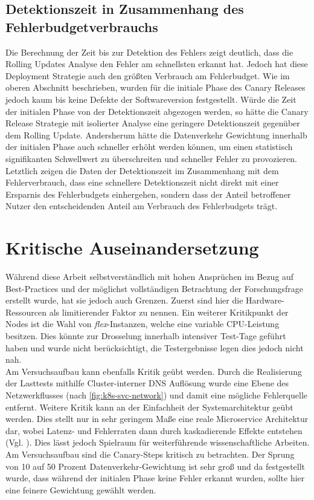 \documentclass[
12pt,
a4paper,
twoside,
openright
]{report}
\begin{document}
	\section{Detektionszeit in Zusammenhang des Fehlerbudgetverbrauchs}
	Die Berechnung der Zeit bis zur Detektion des Fehlers zeigt deutlich, dass die Rolling Updates Analyse den Fehler am schnellsten erkannt hat. Jedoch hat diese Deployment Strategie auch den größten Verbrauch am Fehlerbudget. Wie im oberen Abschnitt beschrieben, wurden für die initiale Phase des Canary Releases jedoch kaum bis keine Defekte der Softwareversion festgestellt. Würde die Zeit der initialen Phase von der Detektionszeit abgezogen werden, so hätte die Canary Release Strategie mit isolierter Analyse eine geringere Detektionszeit gegenüber dem Rolling Update. Andersherum hätte die Datenverkehr Gewichtung innerhalb der initialen Phase auch schneller erhöht werden können, um einen statistisch signifikanten Schwellwert zu überschreiten und schneller Fehler zu provozieren. Letztlich zeigen die Daten der Detektionszeit im Zusammenhang mit dem Fehlerverbrauch, dass eine schnellere Detektionszeit nicht direkt mit einer Ersparnis des Fehlerbudgets einhergehen, sondern dass der Anteil betroffener Nutzer den entscheidenden Anteil am Verbrauch des Fehlerbudgets trägt.
	
	\chapter{Kritische Auseinandersetzung}
	
	Während diese Arbeit selbstverständlich mit hohen Ansprüchen im Bezug auf Best-Practices und der möglichst vollständigen Betrachtung der Forschungsfrage erstellt wurde, hat sie jedoch auch Grenzen. Zuerst sind hier die Hardware-Ressourcen als limitierender Faktor zu nennen. Ein weiterer Kritikpunkt der Nodes ist die Wahl von \textit{flex}-Instanzen, welche eine variable CPU-Leistung besitzen. Dies könnte zur Drosselung innerhalb intensiver Test-Tage geführt haben und wurde nicht berücksichtigt, die Testergebnisse legen dies jedoch nicht nah. \\
	Am Versuchsaufbau kann ebenfalls Kritik geübt werden. Durch die Realisierung der Lasttests mithilfe Cluster-interner DNS Auflösung wurde eine Ebene des Netzwerkflusses (nach \ref{fig:k8s-svc-network}) und damit eine mögliche Fehlerquelle entfernt. Weitere Kritik kann an der Einfachheit der Systemarchitektur geübt werden. Dies stellt nur in sehr geringem Maße eine reale Microservice Architektur dar, wobei Latenz- und Fehlerraten dann durch kaskadierende Effekte entstehen (Vgl. \parencite{yi2015explaining}). Dies lässt jedoch Spielraum für weiterführende wissenschaftliche Arbeiten. 
	Am Versuchsaufbau sind die Canary-Steps kritisch zu betrachten. Der Sprung von 10 auf 50 Prozent Datenverkehr-Gewichtung ist sehr groß und da festgestellt wurde, dass während der initialen Phase keine Fehler erkannt wurden, sollte hier eine feinere Gewichtung gewählt werden.
	
\end{document}
